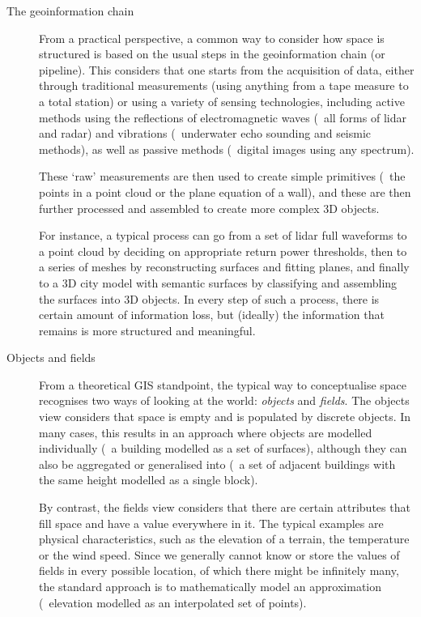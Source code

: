 \begin{description}

\item[The geoinformation chain]
From a practical perspective, a common way to consider how space is structured is based on the usual steps in the geoinformation chain (or pipeline).
This considers that one starts from the acquisition of data, either through traditional measurements (using anything from a tape measure to a total station) or using a variety of sensing technologies, including active methods using the reflections of electromagnetic waves (\eg\ all forms of lidar and radar) and vibrations (\eg\ underwater echo sounding and seismic methods), as well as passive methods (\eg\ digital images using any spectrum).

These `raw' measurements are then used to create simple primitives (\eg\ the points in a point cloud or the plane equation of a wall), and these are then further processed and assembled to create more complex 3D objects.

For instance, a typical process can go from a set of lidar full waveforms to a point cloud by deciding on appropriate return power thresholds, then to a series of meshes by reconstructing surfaces and fitting planes, and finally to a 3D city model with semantic surfaces by classifying and assembling the surfaces into 3D objects.
In every step of such a process, there is certain amount of information loss, but (ideally) the information that remains is more structured and meaningful.

\item[Objects and fields]
From a theoretical GIS standpoint, the typical way to conceptualise space recognises two ways of looking at the world: \emph{objects} and \emph{fields}.
The objects view considers that space is empty and is populated by discrete objects.
In many cases, this results in an approach where objects are modelled individually (\eg\ a building modelled as a set of surfaces), although they can also be aggregated or generalised into (\eg\ a set of adjacent buildings with the same height modelled as a single block).

By contrast, the fields view considers that there are certain attributes that fill space and have a value everywhere in it.
The typical examples are physical characteristics, such as the elevation of a terrain, the temperature or the wind speed.
Since we generally cannot know or store the values of fields in every possible location, of which there might be infinitely many, the standard approach is to mathematically model an approximation (\eg\ elevation modelled as an interpolated set of points).


\end{description}
